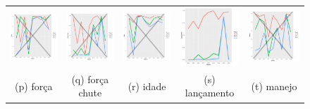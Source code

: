 \documentclass[review]{elsarticle}
\begin{document}
\begin{figure}
\begin{tabular}{ccccc}
  \includegraphics[width=25mm]{forca_result_trans_media} & \includegraphics[width=25mm]{forcachute_result_trans_media}  &   \includegraphics[width=25mm]{idade_result_trans_media} &
  \includegraphics[width=25mm]{lancamento_result_trans_media}  & \includegraphics[width=25mm]{manejo_result_trans_media}  \\
 \scriptsize{(p) força} & \scriptsize{(q) força chute } & \scriptsize{(r) idade} & \scriptsize{(s) lançamento} & \scriptsize{(t) manejo}\\[3pt]
 

\end{tabular}
\end{figure}
\end{document}
